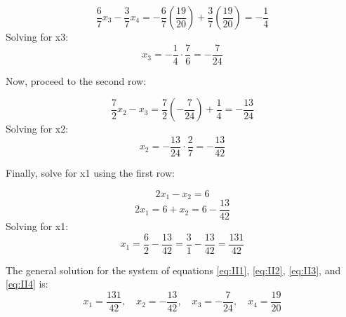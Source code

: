 \[ \frac{6}{7}x_3 - \frac{3}{7}x_4 = -\frac{6}{7} \left(\frac{19}{20}\right) + \frac{3}{7} \left(\frac{19}{20}\right) = -\frac{1}{4} \]
Solving for x3:
\[ x_3 = -\frac{1}{4} \cdot \frac{7}{6} = -\frac{7}{24} \]

Now, proceed to the second row:

\[ \frac{7}{2}x_2 - x_3 = \frac{7}{2} \left(-\frac{7}{24}\right) + \frac{1}{4} = -\frac{13}{24} \]
Solving for x2:
\[ x_2 = -\frac{13}{24} \cdot \frac{2}{7} = -\frac{13}{42} \]

Finally, solve for x1 using the first row:

\[ 2x_1 - x_2 = 6 \]
\[ 2x_1 = 6 + x_2 = 6 - \frac{13}{42} \]
Solving for x1:
\[ x_1 = \frac{6}{2} - \frac{13}{42} = \frac{3}{1} - \frac{13}{42} = \frac{131}{42} \]

The general solution for the system of equations \eqref{eq:II1}, \eqref{eq:II2}, \eqref{eq:II3}, and \eqref{eq:II4} is:
\[ x_1 = \frac{131}{42}, \quad x_2 = -\frac{13}{42}, \quad x_3 = -\frac{7}{24}, \quad x_4 = \frac{19}{20} \]

